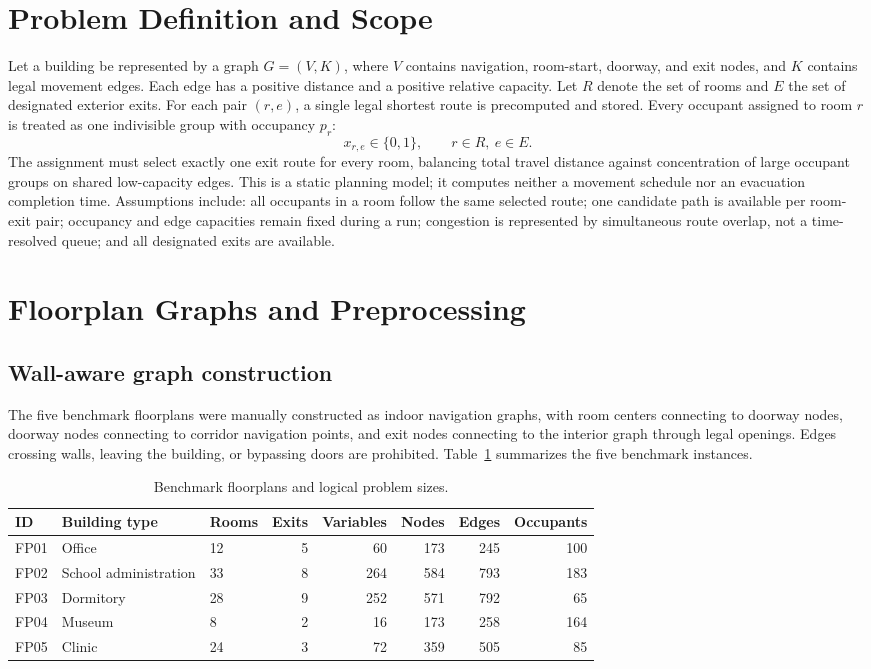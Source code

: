 \documentclass[11pt]{article}
\begin{document}
\section{Problem Definition and Scope}

Let a building be represented by a graph $G=(V,K)$, where $V$ contains navigation, room-start, doorway, and exit nodes, and $K$ contains legal movement edges. Each edge has a positive distance and a positive relative capacity. Let $R$ denote the set of rooms and $E$ the set of designated exterior exits. For each pair $(r,e)$, a single legal shortest route is precomputed and stored. Every occupant assigned to room $r$ is treated as one indivisible group with occupancy $p_r$:
\begin{equation}
x_{r,e} \in \{0,1\}, \qquad r \in R,\ e \in E. \tag{1}
\end{equation}
The assignment must select exactly one exit route for every room, balancing total travel distance against concentration of large occupant groups on shared low-capacity edges. This is a static planning model; it computes neither a movement schedule nor an evacuation completion time. Assumptions include: all occupants in a room follow the same selected route; one candidate path is available per room-exit pair; occupancy and edge capacities remain fixed during a run; congestion is represented by simultaneous route overlap, not a time-resolved queue; and all designated exits are available.

\section{Floorplan Graphs and Preprocessing}

\subsection{Wall-aware graph construction}
The five benchmark floorplans were manually constructed as indoor navigation graphs, with room centers connecting to doorway nodes, doorway nodes connecting to corridor navigation points, and exit nodes connecting to the interior graph through legal openings. Edges crossing walls, leaving the building, or bypassing doors are prohibited. Table~\ref{tab:floorplans} summarizes the five benchmark instances.

\begin{table}[h]
\centering
\caption{Benchmark floorplans and logical problem sizes.}
\label{tab:floorplans}
\small
\begin{tabular}{lllrrrrr}
\toprule
ID & Building type & Rooms & Exits & Variables & Nodes & Edges & Occupants \\
\midrule
FP01 & Office & 12 & 5 & 60 & 173 & 245 & 100 \\
FP02 & School administration & 33 & 8 & 264 & 584 & 793 & 183 \\
FP03 & Dormitory & 28 & 9 & 252 & 571 & 792 & 65 \\
FP04 & Museum & 8 & 2 & 16 & 173 & 258 & 164 \\
FP05 & Clinic & 24 & 3 & 72 & 359 & 505 & 85 \\
\bottomrule
\end{tabular}
\end{table}
\end{document}
